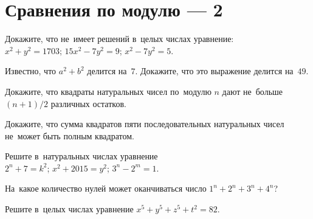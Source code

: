 
\section*{Сравнения по модулю --- 2}


\begin{problems}

\item
Докажите, что не~имеет решений в~целых числах уравнение:
\\
\subproblem $x^2 + y^2 = 1703$;
\qquad
\subproblem $15x^2 - 7y^2 = 9$;
\qquad
\subproblem $x^2 - 7y^2 = 5$.

\item
Известно, что $a^2 + b^2$ делится на~$7$.
Докажите, что это выражение делится на~$49$.

\item
Докажите, что квадраты натуральных чисел по~модулю $n$ дают не~больше
$(n + 1) / 2$ различных остатков.

\item
Докажите, что сумма квадратов пяти последовательных натуральных чисел не~может
быть полным квадратом.

\item
Решите в~натуральных числах уравнение 
\\
\subproblem $2^n + 7 = k^2$;
\qquad
\subproblem $x^2 + 2015 = y^2$;
\qquad
\subproblem $3^n - 2^m = 1$.

\item
На~какое количество нулей может оканчиваться число $1^n + 2^n + 3^n + 4^n$?

\item
Решите в~целых числах уравнение $x^5 + y^5 + z^5 + t^2 = 82$.

\end{problems}


